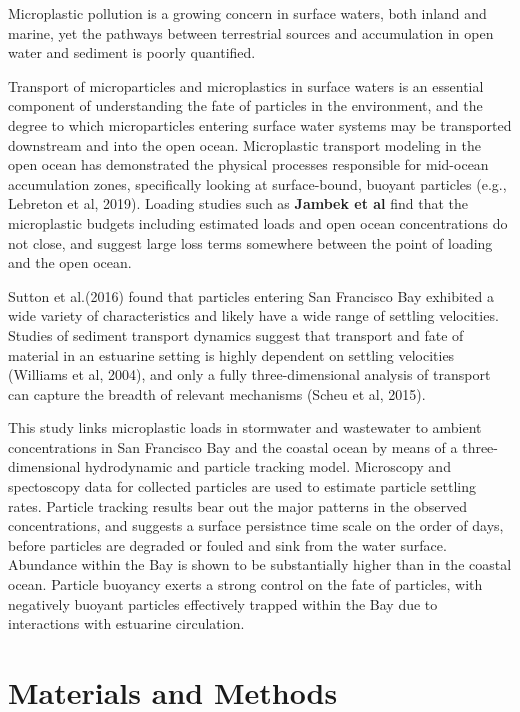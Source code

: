 \documentclass[journal,article,submit,moreauthors,pdftex,water]{Definitions/mdpi}
\begin{document}
  Microplastic pollution is a growing concern in surface waters, both
  inland and marine, yet the pathways between terrestrial sources and
  accumulation in open water and sediment is poorly quantified.

  Transport of microparticles and microplastics in surface waters is
  an essential component of understanding the fate of particles in the
  environment, and the degree to which microparticles entering surface
  water systems may be transported downstream and into the open
  ocean. Microplastic transport modeling in the open ocean has
  demonstrated the physical processes responsible for mid-ocean
  accumulation zones, specifically looking at surface-bound, buoyant
  particles (e.g., Lebreton et al, 2019). Loading studies such as {\bf
  Jambek et al} find that the microplastic budgets including
  estimated loads and open ocean concentrations do not close, and
  suggest large loss terms somewhere between the point of loading and
  the open ocean.

  Sutton et al.(2016) found that particles entering San Francisco Bay
  exhibited a wide variety of characteristics and likely have a wide
  range of settling velocities.  Studies of sediment transport
  dynamics suggest that transport and fate of material in an estuarine
  setting is highly dependent on settling velocities (Williams et al,
  2004), and only a fully three-dimensional analysis of transport can
  capture the breadth of relevant mechanisms (Scheu et al, 2015).
  
  This study links microplastic loads in stormwater and wastewater to
  ambient concentrations in San Francisco Bay and the coastal ocean by
  means of a three-dimensional hydrodynamic and particle tracking
  model.  Microscopy and spectoscopy data for collected particles are
  used to estimate particle settling rates. Particle tracking results
  bear out the major patterns in the observed concentrations, and
  suggests a surface persistnce time scale on the order of days,
  before particles are degraded or fouled and sink from the water
  surface. Abundance within the Bay is shown to be substantially
  higher than in the coastal ocean.  Particle buoyancy exerts a strong
  control on the fate of particles, with negatively buoyant particles
  effectively trapped within the Bay due to interactions with
  estuarine circulation.

  
\section{Materials and Methods}
\end{document}
